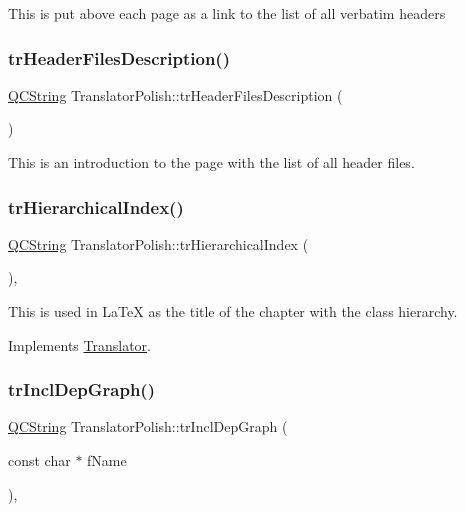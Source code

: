 This is put above each page as a link to the list of all verbatim headers \mbox{\label{class_translator_polish_aac416b1fd5ec343e0a3c9307b6ee1f43}} 
\subsubsection{\texorpdfstring{trHeaderFilesDescription()}{trHeaderFilesDescription()}}
{\footnotesize\ttfamily \mbox{\hyperlink{class_q_c_string}{Q\+C\+String}} Translator\+Polish\+::tr\+Header\+Files\+Description (\begin{DoxyParamCaption}{ }\end{DoxyParamCaption})\hspace{0.3cm}{\ttfamily [inline]}}

This is an introduction to the page with the list of all header files. \mbox{\label{class_translator_polish_a22916f0880b43ad121333e7b0b3330a5}} 
\subsubsection{\texorpdfstring{trHierarchicalIndex()}{trHierarchicalIndex()}}
{\footnotesize\ttfamily \mbox{\hyperlink{class_q_c_string}{Q\+C\+String}} Translator\+Polish\+::tr\+Hierarchical\+Index (\begin{DoxyParamCaption}{ }\end{DoxyParamCaption})\hspace{0.3cm}{\ttfamily [inline]}, {\ttfamily [virtual]}}

This is used in La\+TeX as the title of the chapter with the class hierarchy. 

Implements \mbox{\hyperlink{class_translator}{Translator}}.

\mbox{\label{class_translator_polish_ace0ddab8c25f194d768e54e2753155a1}} 
\subsubsection{\texorpdfstring{trInclDepGraph()}{trInclDepGraph()}}
{\footnotesize\ttfamily \mbox{\hyperlink{class_q_c_string}{Q\+C\+String}} Translator\+Polish\+::tr\+Incl\+Dep\+Graph (\begin{DoxyParamCaption}\item[{const char $\ast$}]{f\+Name }\end{DoxyParamCaption})\hspace{0.3cm}{\ttfamily [inline]}, {\ttfamily [virtual]}}

